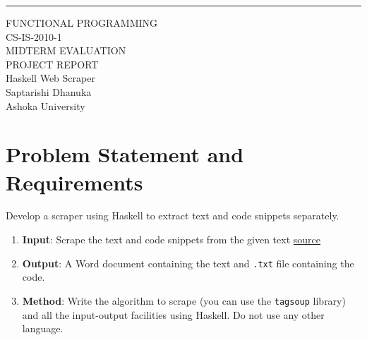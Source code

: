 \documentclass{scrreprt}
\date{}
\begin{document}
\begin{flushright}
    \rule{16cm}{5pt}\vskip1cm
    \begin{bfseries}
        \Huge{FUNCTIONAL PROGRAMMING \\ CS-IS-2010-1 \\ MIDTERM EVALUATION \\ PROJECT REPORT}\\
        \vspace{1.9cm}
        Haskell Web Scraper\\
        \vspace{1.9cm}
        Saptarishi Dhanuka\\
        \vspace{1.9cm}
        Ashoka University\\
    \end{bfseries}
\end{flushright}

\tableofcontents



\chapter{Problem Statement and Requirements}
\begin{tcolorbox}[colback=white,colframe=gray,title={Assigned Project Statement}]
    Develop a scraper using Haskell to extract text and code snippets separately.
    \begin{enumerate}
        \item \textbf{Input}: Scrape the text and code snippets from the given text \href{https://eli.thegreenplace.net/2018/type-erasure-and-reification/}{source}
        \item \textbf{Output}: A Word document containing the text and \texttt{.txt} file containing the code.
        \item \textbf{Method}: Write the algorithm to scrape (you can use the \texttt{tagsoup} library) and all the input-output facilities using Haskell. Do not use any other language.
    \end{enumerate}
\end{tcolorbox}


\end{document}
